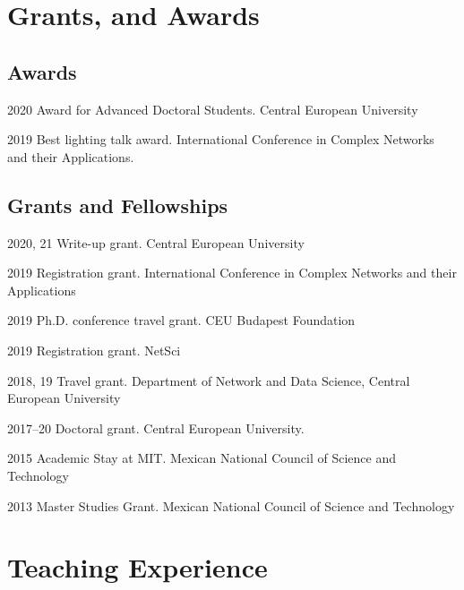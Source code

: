 \documentclass{academiccv}
\begin{document}
\section*{Grants, and Awards}
\subsection*{Awards}
\begin{tablist}
	\item[2020] \tab Award for Advanced Doctoral Students. Central European University 
	\item[2019] \tab Best lighting talk award. International Conference in Complex Networks and their Applications. 
\end{tablist}

\subsection*{Grants and Fellowships}
\begin{tablist}
	\item[2020, 21] \tab Write-up grant. Central European University 
	\item[2019] \tab Registration grant. International Conference in Complex Networks and their Applications
	\item[2019] \tab Ph.D. conference travel grant. CEU Budapest Foundation
	\item[2019] \tab Registration grant. NetSci 
	\item[2018, 19] \tab Travel grant. Department of Network and Data Science, Central European University
	\item[2017--20] \tab Doctoral grant. Central European University. 
	\item[2015] \tab Academic Stay at MIT. Mexican National Council of Science and Technology
	\item[2013] \tab Master Studies Grant. Mexican National Council of Science and Technology
\end{tablist}

\section*{Teaching Experience}
\end{document}
